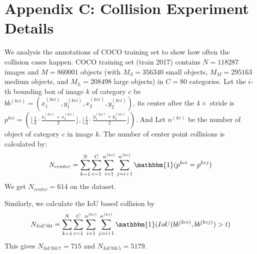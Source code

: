 \documentclass[10pt,twocolumn,letterpaper]{article}
\begin{document}
\section*{Appendix C: Collision Experiment Details}
We analysis the annotations of COCO training set to show how often the collision cases happen.
COCO training set (train 2017) contains $N=118287$ images and $M=860001$ objects (with $M_S = 356340$ small objects, $M_M = 295163$ medium objects, and $M_L = 208498$ large objects) in $C=80$ categories.
Let the $i$-th bounding box of image $k$ of category $c$ be  $bb^{(kci)} = (x_1^{(kci)}, y_1^{(kci)}, x_2^{(kci)}, y_2^{(kci)})$, 
its center after the $4 \times$ stride is $p^{kci} = (\lfloor \frac{1}{4} \cdot \frac{x_1^{(kci)} + x_2^{(kci)}}{2}\rfloor, \lfloor \frac{1}{4} \cdot \frac{y_1^{(kci)} + y_2^{(kci)}}{2}\rfloor)$.
And Let $n^{(kc)}$ be the number of object of category $c$ in image $k$.
The number of center point collisions is calculated by:
\begin{equation}
    N_{center} = \sum_{k=1}^{N} \sum_{c=1}^{C} \sum_{i=1}^{n^{(kc)}} \sum_{j=i+1}^{n^{(kc)}} \mathbbm{1} (p^{kci} = p^{kcj})
\end{equation}
We get $N_{center} = 614$ on the dataset.

Similarly, we calculate the IoU based collision by
\begin{equation}
    N_{IoU@t} = \sum_{k=1}^{N} \sum_{c=1}^{C} \sum_{i=1}^{n^{(kc)}} \sum_{j=i+1}^{n^{(kc)}} \mathbbm{1} (IoU(bb^{(kci)}, bb^{(kcj)}) > t)
\end{equation}
This gives $N_{IoU@0.7} = 715$ and $N_{IoU@0.5} = 5179$.
\end{document}
